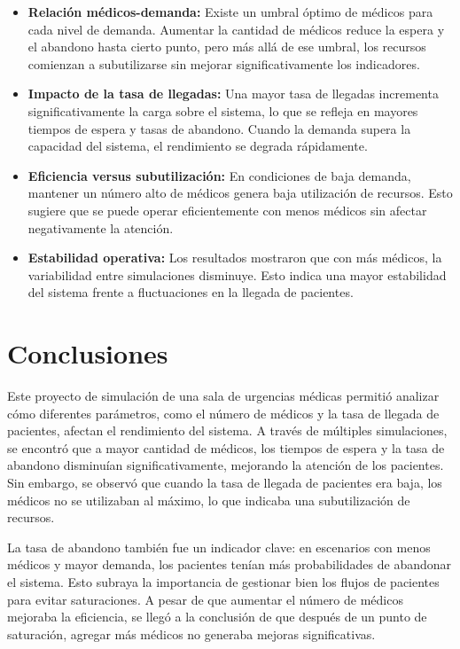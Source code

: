 \documentclass[12pt]{article}
\begin{document}
\begin{itemize}
    \item \textbf{Relación médicos-demanda:} Existe un umbral óptimo de médicos para cada nivel de demanda. Aumentar la cantidad de médicos reduce la espera y el abandono hasta cierto punto, pero más allá de ese umbral, los recursos comienzan a subutilizarse sin mejorar significativamente los indicadores.

    \item \textbf{Impacto de la tasa de llegadas:} Una mayor tasa de llegadas incrementa significativamente la carga sobre el sistema, lo que se refleja en mayores tiempos de espera y tasas de abandono. Cuando la demanda supera la capacidad del sistema, el rendimiento se degrada rápidamente.

    \item \textbf{Eficiencia versus subutilización:} En condiciones de baja demanda, mantener un número alto de médicos genera baja utilización de recursos. Esto sugiere que se puede operar eficientemente con menos médicos sin afectar negativamente la atención.

    \item \textbf{Estabilidad operativa:} Los resultados mostraron que con más médicos, la variabilidad entre simulaciones disminuye. Esto indica una mayor estabilidad del sistema frente a fluctuaciones en la llegada de pacientes.
\end{itemize}

\section{Conclusiones}

Este proyecto de simulación de una sala de urgencias médicas permitió analizar cómo diferentes parámetros, como el número de médicos y la tasa de llegada de pacientes, afectan el rendimiento del sistema. A través de múltiples simulaciones, se encontró que a mayor cantidad de médicos, los tiempos de espera y la tasa de abandono disminuían significativamente, mejorando la atención de los pacientes. Sin embargo, se observó que cuando la tasa de llegada de pacientes era baja, los médicos no se utilizaban al máximo, lo que indicaba una subutilización de recursos.

La tasa de abandono también fue un indicador clave: en escenarios con menos médicos y mayor demanda, los pacientes tenían más probabilidades de abandonar el sistema. Esto subraya la importancia de gestionar bien los flujos de pacientes para evitar saturaciones. A pesar de que aumentar el número de médicos mejoraba la eficiencia, se llegó a la conclusión de que después de un punto de saturación, agregar más médicos no generaba mejoras significativas.
\end{document}
